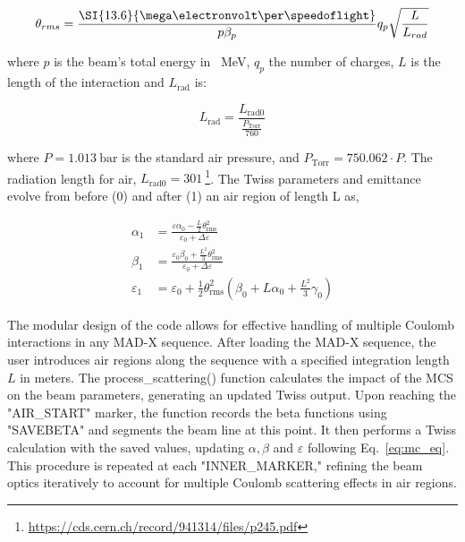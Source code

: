 \documentclass[a4paper,
               biblatex,     %
               ]{jacow}
\begin{document}
\[
\theta_{rms} = \frac{\SI{13.6}{\mega\electronvolt\per\speedoflight}}{p\beta_{p}}q_{p}\sqrt\frac{L}{L_{rad}}\]

\noindent where $p$ is the beam's total energy in \SI{}{\mega\electronvolt}, $q_{p}$ the number of charges, $L$ is the length of the interaction and $L_{\text{rad}}$ is:

\[
L_{\text{rad}} = \frac{L_{\text{rad0}}}{\frac{P_{\text{Torr}}}{760}}
\]

\noindent where $P=\SI{1.013}{\bar}$ is the standard air pressure, and $P_{\text{Torr}} = 750.062\cdot P$. The radiation length for air, $L_{\text{rad0}}=\SI{301}{}$\footnote{\href{https://cds.cern.ch/record/941314/files/p245.pdf}{{https://cds.cern.ch/record/941314/files/p245.pdf}}}. The Twiss parameters and emittance evolve from before (0) and after (1) an air region of length L as,


\begin{equation}
\label{eq:mc_eq}
\begin{aligned}
\alpha_{1} &= \frac{\varepsilon \alpha_0 - \frac{L}{2} \theta_{\text{rms}}^2}{\varepsilon_0 + \Delta \varepsilon}\\
\beta_{1} &= \frac{\varepsilon_0 \beta_0 + \frac{L^2}{3} \theta_{\text{rms}}^2}{\varepsilon_0 + \Delta \varepsilon}\\
\varepsilon_{1} &= \varepsilon_0 + \frac{1}{2} \theta_{\text{rms}}^2 \left( \beta_0 + L \alpha_0 + \frac{L^2}{3} \gamma_0 \right)
\end{aligned}
\end{equation}

The modular design of the code allows for effective handling of multiple Coulomb interactions in any MAD-X sequence. After loading the MAD-X sequence, the user introduces air regions along the sequence with a specified integration length $L$ in meters. The process\_scattering() function calculates the impact of the MCS on the beam parameters, generating an updated Twiss output. Upon reaching the "AIR\_START" marker, the function records the beta functions using "SAVEBETA" and segments the beam line at this point. It then performs a Twiss calculation with the saved values, updating $\alpha, \beta$ and $\varepsilon$ following Eq.~\eqref{eq:mc_eq}. This procedure is repeated at each "INNER\_MARKER," refining the beam optics iteratively to account for multiple Coulomb scattering effects in air regions.
\end{document}
